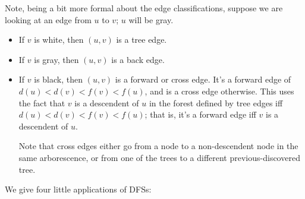 \documentclass{article}
\begin{document}
Note, being a bit more formal about the edge classifications, 
suppose we are looking at an edge from $u$ to $v$; $u$
will be gray.
\begin{itemize}
	\item If $v$ is white, then $(u,v)$ is a tree edge.
	\item If $v$ is gray, then $(u,v)$ is a back edge.
	\item If $v$ is black, then $(u,v)$ is a forward or cross edge.
	It's a forward edge of $d(u) < d(v) < f(v) < f(u)$, and is
	a cross edge otherwise.
	This uses the fact that $v$ is a descendent of $u$ in the forest defined
	by tree edges iff $d(u) < d(v) < f(v) < f(u)$; that is, it's a forward
	edge iff $v$ is a descendent of $u$.
	
	Note that cross edges either go from a node to a non-descendent node in
	the same arborescence, or from one of the trees to a different 
	previous-discovered tree.
\end{itemize}
We give four little applications of DFSs:
\end{document}
